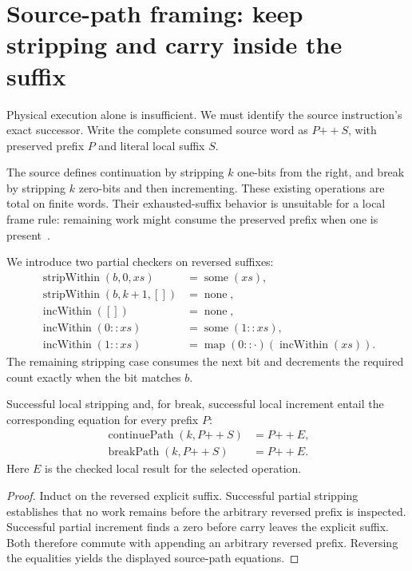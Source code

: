 \section{Source-path framing: keep stripping and carry inside the suffix}
Physical execution alone is insufficient. We must identify the source instruction's exact successor. Write the complete consumed source word as $P\mathbin{+\!+}S$, with preserved prefix $P$ and literal local suffix $S$.

The source defines continuation by stripping $k$ one-bits from the right, and break by stripping $k$ zero-bits and then incrementing. These existing operations are total on finite words. Their exhausted-suffix behavior is unsuitable for a local frame rule: remaining work might consume the preserved prefix when one is present~\cite{registerpath}.

We introduce two partial checkers on reversed suffixes:
\begin{align*}
 \operatorname{stripWithin}(b,0,xs)&=\operatorname{some}(xs),\\
 \operatorname{stripWithin}(b,k+1,[])&=\operatorname{none},\\
 \operatorname{incWithin}([])&=\operatorname{none},\\
 \operatorname{incWithin}(0::xs)&=\operatorname{some}(1::xs),\\
 \operatorname{incWithin}(1::xs)&=
   \operatorname{map}(0::\cdot)(\operatorname{incWithin}(xs)).
\end{align*}
The remaining stripping case consumes the next bit and decrements the required count exactly when the bit matches $b$.

\begin{lemma}\label{lem:arithmetic}
Successful local stripping and, for break, successful local increment entail the corresponding equation for every prefix $P$:
\begin{align*}
 \operatorname{continuePath}(k,P\mathbin{+\!+}S)&=P\mathbin{+\!+}E,\\
 \operatorname{breakPath}(k,P\mathbin{+\!+}S)&=P\mathbin{+\!+}E.
\end{align*}
Here $E$ is the checked local result for the selected operation.
\end{lemma}
\begin{proof}
Induct on the reversed explicit suffix. Successful partial stripping establishes that no work remains before the arbitrary reversed prefix is inspected. Successful partial increment finds a zero before carry leaves the explicit suffix. Both therefore commute with appending an arbitrary reversed prefix. Reversing the equalities yields the displayed source-path equations.
\end{proof}

